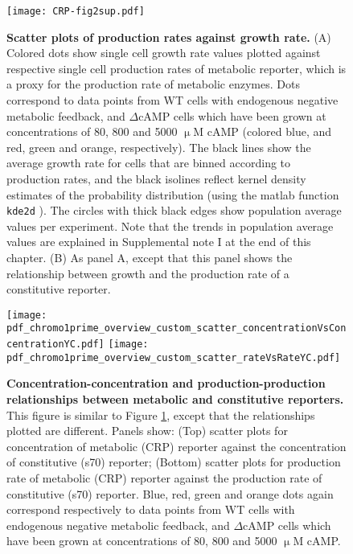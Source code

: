 \begin{figure}
	\centering
	\texttt{[image: CRP-fig2sup.pdf]}
	\caption{ 
	\textbf{Scatter plots of production rates against growth rate.}
	(A) Colored dots show single cell growth rate values plotted against respective single cell production rates of metabolic reporter, which is a proxy for the production rate of metabolic enzymes. 	
	Dots correspond to data points from WT cells with endogenous negative metabolic feedback, and $\Delta$cAMP cells which have been grown at concentrations of 80, 800 and 5000 $\upmu$M cAMP 
	(colored blue, and red, green and orange, respectively).
	The black lines show the average growth rate for cells that are binned according to production rates, and the black isolines reflect kernel density estimates of the probability distribution (using the matlab function \texttt{kde2d} \cite{Botev2010}).
	The circles with thick black edges show population average values per experiment.
	Note that the trends in population average values are explained in Supplemental note I at the end of this chapter.
	(B) As panel A, except that this panel shows the relationship between growth and the production rate of a constitutive reporter. 	
	}
	\label{fig:CRP:fig2sup}
\end{figure}

\begin{figure}
	\centering
	\texttt{[image: pdf\_chromo1prime\_overview\_custom\_scatter\_concentrationVsConcentrationYC.pdf]}
	\texttt{[image: pdf\_chromo1prime\_overview\_custom\_scatter\_rateVsRateYC.pdf]}	
	\caption{ 
		\textbf{Concentration-concentration and production-production relationships between metabolic and constitutive reporters.}
		This figure is similar to Figure \ref{fig:CRP:fig2sup}, except that the relationships plotted are different.
		Panels show: (Top) scatter plots for concentration of metabolic (CRP) reporter against the concentration of constitutive (s70) reporter; 
		(Bottom) scatter plots for production rate of metabolic (CRP) reporter against the production rate of constitutive (s70) reporter.
		Blue, red, green and orange dots again correspond respectively to data points from WT cells with endogenous negative metabolic feedback, and $\Delta$cAMP cells which have been grown at concentrations of 80, 800 and 5000 $\upmu$M cAMP.
	}
	\label{fig:CRP:fig3scatters_CC_pp}
\end{figure}



